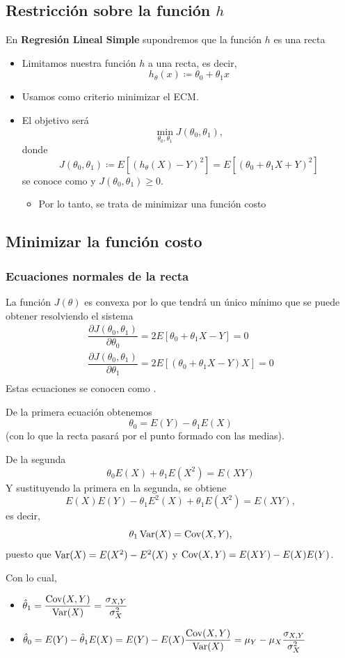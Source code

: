 \subsection{Restricción sobre la función $h$}
En \textbf{Regresión Lineal Simple} supondremos que la función $h$ es una recta
\begin{itemize}
\item Limitamos nuestra función $h$ a una recta, es decir, \[ h_\theta(x)\coloneq\theta_0+\theta_1x \]
\item Usamos como criterio minimizar el ECM.
\item El objetivo será \[ \min_{\theta_0,\theta_1}J(\theta_0,\theta_1), \] donde \[ J(\theta_0,\theta_1)\coloneq E[(h_\theta(X)-Y)^2]=E[(\theta_0+\theta_1X+Y)^2] \]se conoce como  y $J(\theta_0,\theta_1)\ge0$.
\begin{itemize}[label=\color{lightblue}$\to$]
\item Por lo tanto, se trata de minimizar una función costo
\end{itemize}
\end{itemize}
\subsection{Minimizar la función costo}
\subsubsection{Ecuaciones normales de la recta}
La función $J(\theta)$ es convexa por lo que tendrá un único mínimo que se puede obtener resolviendo el sistema \[ \begin{array}{l}
\dfrac{\partial J(\theta_0,\theta_1)}{\partial\theta_0}=2E[\theta_0+\theta_1X-Y]=0\\
\dfrac{\partial J(\theta_0,\theta_1)}{\partial\theta_1}=2E[(\theta_0+\theta_1X-Y)X]=0\\
\end{array} \]
Estas ecuaciones se conocen como .

De la primera ecuación obtenemos \[ \theta_0=E(Y)-\theta_1E(X) \](con lo que la recta pasará por el punto formado con las medias).

De la segunda \[ \theta_0E(X)+\theta_1E(X^2)=E(XY) \]
Y sustituyendo la primera en la segunda, se obtiene \[ E(X)E(Y)-\theta_1E^2(X)+\theta_1E(X^2)=E(XY), \]es decir, \[ \theta_1\operatorname{Var}(X)=\operatorname{Cov}(X,Y), \]puesto que $\operatorname{Var}(X)=E(X^2)-E^2(X)$ y $\operatorname{Cov}(X,Y)=E(XY)-E(X)E(Y)$.

Con lo cual,
\begin{itemize}[label=\color{lightblue}$\to$]
\item $\hat{\theta}_1=\dfrac{\operatorname{Cov}(X,Y)}{\operatorname{Var}(X)}=\dfrac{\sigma_{X,Y}}{\sigma_X^2}$
\item $\hat{\theta}_0=E(Y)-\hat{\theta}_1E(X)=E(Y)-E(X)\dfrac{\operatorname{Cov}(X,Y)}{\operatorname{Var}(X)}=\mu_Y-\mu_X\dfrac{\sigma_{X,Y}}{\sigma_X^2}$
\end{itemize}

